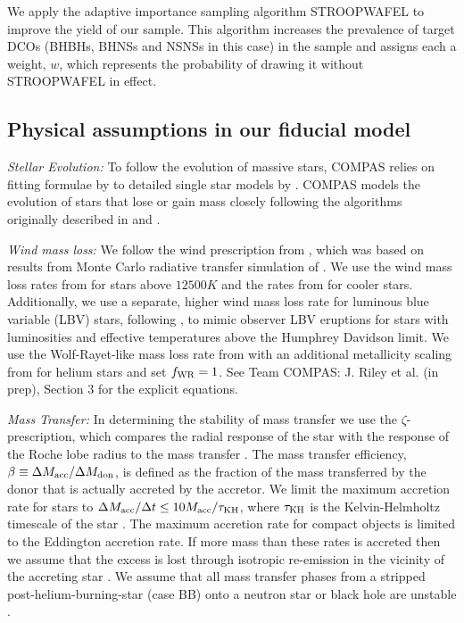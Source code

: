 We apply the adaptive importance sampling algorithm STROOPWAFEL \citep{Broekgaarden+2019} to improve the yield of our sample. This algorithm increases the prevalence of target DCOs (BHBHs, BHNSs and NSNSs in this case) in the sample and assigns each a weight, $w$, which represents the probability of drawing it without STROOPWAFEL in effect.

\subsection{Physical assumptions in our fiducial model}\label{sec:fiducial_physics}

\textit{Stellar Evolution:} To follow the evolution of massive stars, COMPAS relies on fitting formulae by \citet{Hurley+2000} to detailed single star models by \citet{Pols+1998}. COMPAS models the evolution of stars that lose or gain mass closely following the algorithms originally described in \citet{Tout+1996} and \citet{Hurley+2002}.

\textit{Wind mass loss:} We follow the wind prescription from \citet{Belczynski+2008}, which was based on results from Monte Carlo radiative transfer simulation of \citet{Vink+2000, Vink+2001}. We use the wind mass loss rates from \citet{Vink+2001} for stars above $12500 \unit{K}$ and the rates from \citet{Hurley+2000} for cooler stars. Additionally, we use a separate, higher wind mass loss rate for luminous blue variable (LBV) stars, following \citet{Belczynski+2008}, to mimic observer LBV eruptions for stars with luminosities and  effective temperatures above the Humphrey Davidson limit. We use the Wolf-Rayet-like mass loss rate from \citet{Hamann+1998} with an additional metallicity scaling from \citet{Vink+2005} for helium stars and set $f_{\rm WR} = 1$. See Team COMPAS: J. Riley et al. (in prep), Section 3 for the explicit equations.

\textit{Mass Transfer:} In determining the stability of mass transfer we use the $\zeta$-prescription, which compares the radial response of the star with the response of the Roche lobe radius to the mass transfer \citep[e.g.][]{Hjellming+1987}. The mass transfer efficiency, $\beta \equiv \Delta M_{\rm acc} / \Delta M_{\rm don}$, is defined as the fraction of the mass transferred by the donor that is actually accreted by the accretor. We limit the maximum accretion rate for stars to $\Delta M_{\rm acc} / \Delta t \le 10 M_{\rm acc} / \tau_{\rm KH}$, where $\tau_{\rm KH}$ is the Kelvin-Helmholtz timescale of the star \citep{Paczynski+1972, Hurley+2002}. The maximum accretion rate for compact objects is limited to the Eddington accretion rate. If more mass than these rates is accreted then we assume that the excess is lost through isotropic re-emission in the vicinity of the accreting star \citep[e.g.][]{Massevitch+1975, Soberman+1997}. We assume that all mass transfer phases from a stripped post-helium-burning-star (case BB) onto a neutron star or black hole are unstable \citep{Tauris+2015}.

